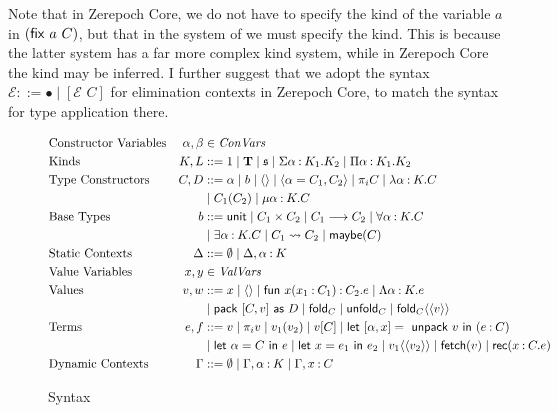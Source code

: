 \documentclass{article}
\renewcommand{\:}{\mathbin{:}}
\begin{document}
Note that in Zerepoch Core, we do not have to specify the kind of the variable $a$ in $({\sf fix}\,\, a\,\, C)$, but that in the system of \cite{Dreyer05} we must specify the kind. This is because the latter system has a far more complex kind system, while in Zerepoch Core the kind may be inferred. I further suggest that we adopt the syntax $\mathcal{E} ::= \bullet \mid [ \mathcal{E}\,\, C]$ for elimination contexts in Zerepoch Core, to match the syntax for type application there.

\begin{figure}
\begin{align*}
  & \text{Constructor Variables} &\alpha, \beta &\in \textit{ConVars}\\
  & \text{Kinds} &K,L  &::= 1 \mid \textbf{T} \mid \mathfrak{s} \mid \Sigma \alpha \: K_1.K_2 \mid \Pi\alpha\:K_1.K_2 \\
  & \text{Type Constructors} &C,D  &::= \alpha \mid b \mid \langle \rangle \mid \langle \alpha = C_1,C_2 \rangle \mid \pi_iC \mid \lambda \alpha \: K.C \\
  &&& \mid C_1(C_2) \mid \mu\alpha\: K .C\\
  & \text{Base Types} & b & ::= \text{{\sf unit}} \mid C_1 \times C_2 \mid C_1 \longrightarrow C_2 \mid \forall \alpha \: K.C
  \\ &&& \mid \exists \alpha \: K .C \mid C_1 \rightsquigarrow C_2 \mid \text{{\sf maybe}}(C) \\
  & \text{Static Contexts} & \Delta & ::= \emptyset \mid \Delta,\alpha \: K\\
  & \text{Value Variables} & x,y & \in \textit{ValVars} \\
  & \text{Values} & v,w & ::= x \mid \langle \rangle \mid \text{{\sf fun} } x(x_1\:C_1)\:C_2.e \mid \Lambda\alpha\:K.e\\
  &&& \mid \text{{\sf pack} } [C,v] \text{ {\sf as} } D \mid \text{{\sf fold}}_C \mid \text{{\sf unfold}}_C \mid \text{{\sf fold}}_C\langle \langle v \rangle \rangle \\
  & \text{Terms} & e,f & ::= v \mid \pi_iv \mid v_1(v_2) \mid v[C] \mid \text{{\sf let} } [\alpha,x] = \text{ {\sf unpack} } v \text{ {\sf in} } (e\:C) \\
  &&& \mid \text{{\sf let} } \alpha = C \text{ {\sf in} } e \mid \text{{\sf let} } x = e_1 \text{ {\sf in} } e_2 \mid v_1 \langle \langle v_2 \rangle \rangle \mid \text{{\sf fetch}}(v) \mid \text{{\sf rec}}(x\:C.e)\\
  & \text{Dynamic Contexts} & \Gamma & ::= \emptyset \mid \Gamma,\alpha\:K \mid \Gamma,x\:C
\end{align*}  
\caption{Syntax}
\end{figure}
\end{document}
